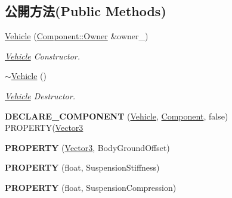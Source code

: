 \subsection*{公開方法(Public Methods)}
\begin{DoxyCompactItemize}
\item 
\hyperlink{class_magnum_1_1_physics3_1_1_vehicle_aed5e5e80ea343bfd57b786d6a1509ac7}{Vehicle} (\hyperlink{class_magnum_1_1_component_1_1_owner}{Component\+::\+Owner} \&owner\+\_\+)
\begin{DoxyCompactList}\small\item\em \hyperlink{class_magnum_1_1_physics3_1_1_vehicle}{Vehicle} Constructor. \end{DoxyCompactList}\item 
\hyperlink{class_magnum_1_1_physics3_1_1_vehicle_afae1fd39511a7ea979ad0e5e97a71dcf}{$\sim$\+Vehicle} ()
\begin{DoxyCompactList}\small\item\em \hyperlink{class_magnum_1_1_physics3_1_1_vehicle}{Vehicle} Destructor. \end{DoxyCompactList}\item 
{\bfseries D\+E\+C\+L\+A\+R\+E\+\_\+\+C\+O\+M\+P\+O\+N\+E\+NT} (\hyperlink{class_magnum_1_1_physics3_1_1_vehicle}{Vehicle}, \hyperlink{class_magnum_1_1_component}{Component}, false) P\+R\+O\+P\+E\+R\+TY(\hyperlink{class_magnum_1_1_vector3}{Vector3}\hypertarget{class_magnum_1_1_physics3_1_1_vehicle_a724b38d8a9d9743c7b89bf0aa2e03aa5}{}\label{class_magnum_1_1_physics3_1_1_vehicle_a724b38d8a9d9743c7b89bf0aa2e03aa5}

\item 
{\bfseries P\+R\+O\+P\+E\+R\+TY} (\hyperlink{class_magnum_1_1_vector3}{Vector3}, Body\+Ground\+Offset)\hypertarget{class_magnum_1_1_physics3_1_1_vehicle_a71ed0dc43a137dcda0f0b3a4ab15a9a3}{}\label{class_magnum_1_1_physics3_1_1_vehicle_a71ed0dc43a137dcda0f0b3a4ab15a9a3}

\item 
{\bfseries P\+R\+O\+P\+E\+R\+TY} (float, Suspension\+Stiffness)\hypertarget{class_magnum_1_1_physics3_1_1_vehicle_ae06640c5e162ee03c068d46139f6e72e}{}\label{class_magnum_1_1_physics3_1_1_vehicle_ae06640c5e162ee03c068d46139f6e72e}

\item 
{\bfseries P\+R\+O\+P\+E\+R\+TY} (float, Suspension\+Compression)\hypertarget{class_magnum_1_1_physics3_1_1_vehicle_ac139b35d2571dcd14272d91ad6b83de8}{}\label{class_magnum_1_1_physics3_1_1_vehicle_ac139b35d2571dcd14272d91ad6b83de8}


\end{DoxyCompactItemize}
